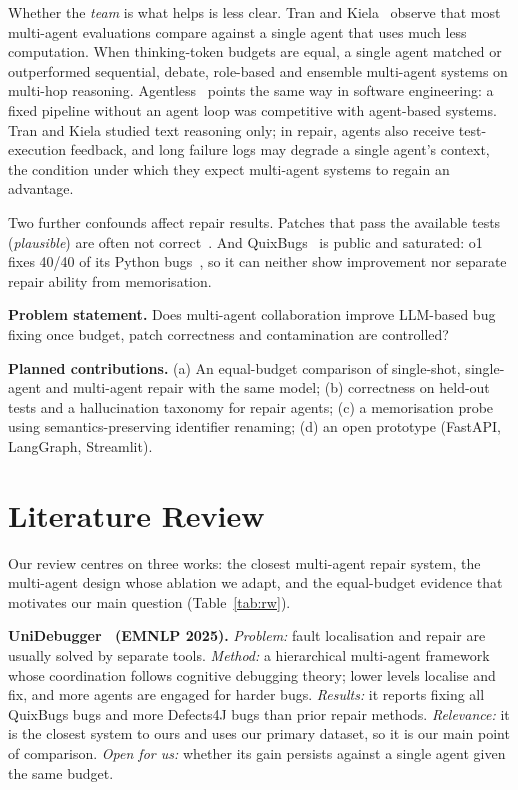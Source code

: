 \documentclass[conference]{IEEEtran}
\begin{document}
Whether the \emph{team} is what helps is less clear. Tran and
Kiela~\cite{trankiela} observe that most multi-agent evaluations compare against
a single agent that uses much less computation. When thinking-token budgets are
equal, a single agent matched or outperformed sequential, debate, role-based and
ensemble multi-agent systems on multi-hop reasoning. Agentless~\cite{agentless}
points the same way in software engineering: a fixed pipeline without an agent
loop was competitive with agent-based systems. Tran and Kiela studied text
reasoning only; in repair, agents also receive test-execution feedback, and
long failure logs may degrade a single agent's context, the condition under
which they expect multi-agent systems to regain an advantage.

Two further confounds affect repair results. Patches that pass the available
tests (\emph{plausible}) are often not correct~\cite{qi2015}. And
QuixBugs~\cite{quixbugs} is public and saturated: o1 fixes 40/40 of its
Python bugs~\cite{gpto1}, so it can neither show improvement nor separate
repair ability from memorisation.

\textbf{Problem statement.} Does multi-agent collaboration improve LLM-based bug
fixing once budget, patch correctness and contamination are controlled?

\textbf{Planned contributions.} (a) An equal-budget comparison of single-shot,
single-agent and multi-agent repair with the same model; (b) correctness on
held-out tests and a hallucination taxonomy for repair agents; (c) a
memorisation probe using semantics-preserving identifier renaming; (d) an open
prototype (FastAPI, LangGraph, Streamlit).

\section{Literature Review}
Our review centres on three works: the closest multi-agent repair system, the
multi-agent design whose ablation we adapt, and the equal-budget evidence that
motivates our main question (Table~\ref{tab:rw}).

\textbf{UniDebugger~\cite{unidebugger} (EMNLP 2025).} \emph{Problem:} fault
localisation and repair are usually solved by separate tools. \emph{Method:} a
hierarchical multi-agent framework whose coordination follows cognitive
debugging theory; lower levels localise and fix, and more agents are engaged
for harder bugs. \emph{Results:} it reports fixing all QuixBugs bugs and more
Defects4J bugs than prior repair methods.
\emph{Relevance:} it is the closest system to ours and uses our primary
dataset, so it is our main point of comparison. \emph{Open for us:} whether its
gain persists against a single agent given the same budget.
\end{document}
